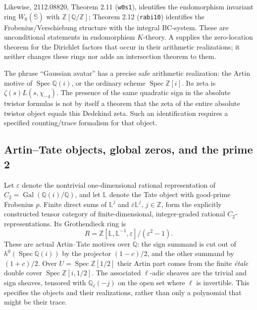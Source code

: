 Likewise, 2112.08820, Theorem 2.11 (\texttt{w0s1}), identifies the
endomorphism invariant ring $W_0(\overline{\mathbb S})$ with
$\mathbb Z[\mathbb Q/\mathbb Z]$; Theorem 2.12
(\texttt{rabi10}) identifies the Frobenius/Verschiebung structure with
the integral BC-system.  These are unconditional statements in
endomorphism $K$-theory.  A supplies the zero-location theorem for the
Dirichlet factors that occur in their arithmetic realizations; it neither
changes these rings nor adds an intersection theorem to them.

The phrase ``Gaussian avatar'' has a precise safe arithmetic realization:
the Artin motive of $\operatorname{Spec}\mathbb Q(i)$, or the ordinary
scheme $\operatorname{Spec}\mathbb Z[i]$.  Its zeta is
$\zeta(s)L(s,\chi_{-4})$.  The presence of the same quadratic sign in the
absolute twistor formulas is not by itself a theorem that the zeta of the
entire absolute twistor object equals this Dedekind zeta.  Such an
identification requires a specified counting/trace formalism for that object.

\subsection{Artin--Tate objects, global zeros, and the prime 2}

Let $\varepsilon$ denote the nontrivial one-dimensional rational
representation of $C_2=\operatorname{Gal}(\mathbb Q(i)/\mathbb Q)$, and
let $\mathbb L$ denote the Tate object with good-prime Frobenius $p$.
Finite direct sums of $\mathbb L^j$ and $\varepsilon\mathbb L^j$,
$j\in\mathbb Z$, form the explicitly constructed tensor category of
finite-dimensional, integer-graded rational $C_2$-representations.
Its Grothendieck ring is
\[
 R=\mathbb Z[\mathbb L,\mathbb L^{-1},\varepsilon]/(\varepsilon^2-1).
\]
These are actual Artin--Tate motives over $\mathbb Q$: the sign summand
is cut out of $h^0(\operatorname{Spec}\mathbb Q(i))$ by the projector
$(1-c)/2$, and the other summand by $(1+c)/2$.
Over $U=\operatorname{Spec}\mathbb Z[1/2]$ their Artin part comes from
the finite \emph{\'etale} double cover $\operatorname{Spec}\mathbb Z[i,1/2]$.
The associated $\ell$-adic sheaves are the trivial and sign sheaves,
tensored with $\mathbb Q_\ell(-j)$ on the open set where $\ell$ is
invertible.  This specifies the objects and their realizations, rather
than only a polynomial that might be their trace.

